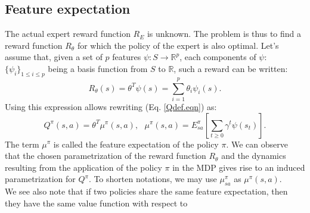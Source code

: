 \documentclass{article}
\begin{document}
\subsection{Feature expectation}
\label{ConsiderationsTechniques.sec}
The actual expert reward function $R_E$ is unknown. The problem is
 thus to find a reward function $R_\theta$ for which the policy of
the expert is also optimal. Let's assume that, given a set of $p$
features $\psi: S\rightarrow \mathbb{R}^p$, each components of
$\psi$: $\{\psi_i\}_{1\leq i \leq p}$ being a basis function from
$S$ to $\mathbb{R}$, such a reward can be written:
\begin{equation}
\label{hatRdef.eqn} %
R_\theta(s) = \theta^T\psi(s) =
\sum_{i=1}^p\theta_i\psi_i(s).
\end{equation}
Using this expression allows rewriting (Eq. \eqref{Qdef.eqn}) as:
\begin{equation}
Q^\pi(s,a)=\theta^T\mu^\pi(s,a),\text{ }\mu^\pi(s,a) =
E^\pi_{sa}[\sum_{t\geq 0}\gamma^t\psi(s_t)]. \label{Qmu.eqn}
\end{equation}
%
The term $\mu^\pi$ is called the feature expectation of the policy
$\pi$. We can observe that the chosen parametrization of the reward
function $R_\theta$ and the dynamics resulting from the application
of the policy $\pi$ in the MDP gives rise to an induced
parametrization for $Q^\pi$. To
shorten notations, we may use $\mu^\pi_{sa}$ as $\mu^\pi(s,a)$.\\
%
We see also note that if two policies share the same feature
expectation, then they have the same value function with respect to
\end{document}
